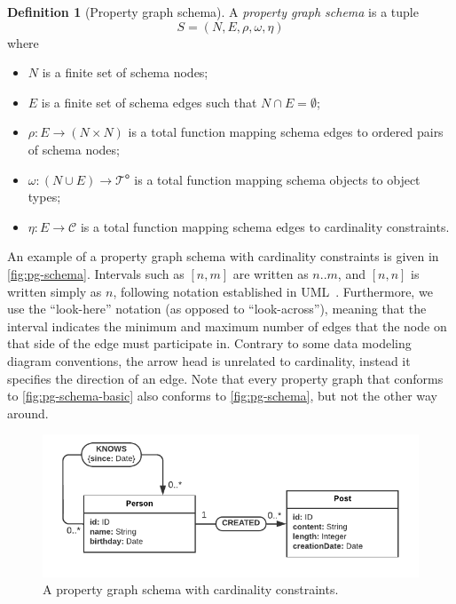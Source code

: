 \documentclass{report}
\theoremstyle{definition}
\newtheorem{definition}{Definition}
\newcommand{\otypes}{\mathcal{T}^\mathsf{o}}
\begin{document}
\begin{definition}[Property graph schema]
  \label{def:pg-schema}
  A \emph{property graph schema} is a tuple $$S = (N, E, \rho, \omega, \eta)$$ where
  \begin{itemize}
    \item $N$ is a finite set of schema nodes;
    \item $E$ is a finite set of schema edges such that $N \cap E = \emptyset$;
    \item $\rho : E \to (N \times N)$ is a total function mapping schema edges to ordered pairs of schema nodes;
    \item $\omega : (N \cup E) \to \otypes$ is a total function mapping schema objects to object types;
    \item $\eta : E \to \mathcal{C}$ is a total function mapping schema edges to cardinality constraints.
  \end{itemize}
\end{definition}

An example of a property graph schema with cardinality constraints is given in \autoref{fig:pg-schema}. Intervals such as $[n, m]$ are written as $n..m$, and $[n, n]$ is written simply as $n$, following notation established in UML~\citep{uml}. Furthermore, we use the ``look-here'' notation (as opposed to ``look-across''), meaning that the interval indicates the minimum and maximum number of edges that the node on that side of the edge must participate in. Contrary to some data modeling diagram conventions, the arrow head is unrelated to cardinality, instead it specifies the direction of an edge. Note  that every property graph that conforms to \autoref{fig:pg-schema-basic} also conforms to \autoref{fig:pg-schema}, but not the other way around.

\begin{figure}[t]
  \centering
  \includegraphics{figures/pg-schema.pdf}
  \caption[A property graph schema with cardinality constraints]{A property graph schema with cardinality constraints.}
  \label{fig:pg-schema}
\end{figure}
\end{document}
